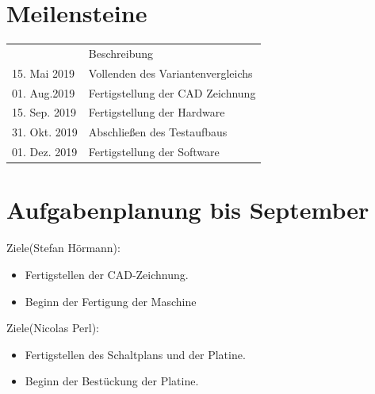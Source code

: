 \section{Meilensteine}
\begin{table}[h!]
    \begin{tabular}{ll}
        \hline
        \rowcolor[HTML]{C0C0C0}
        \multicolumn{2}{c}{\cellcolor[HTML]{C0C0C0}\textbf{Meilensteine}}                      \\ \hline
        \rowcolor[HTML]{EFEFEF}
        \multicolumn{1}{l|}{\cellcolor[HTML]{EFEFEF}Datum} & Beschreibung                      \\ \hline
        \multicolumn{1}{l|}{15. Mai 2019}                   & Vollenden des Variantenvergleichs \\ \hline
        \multicolumn{1}{l|}{01. Aug.2019}                    & Fertigstellung der CAD Zeichnung  \\ \hline
        \multicolumn{1}{l|}{15. Sep. 2019}                   & Fertigstellung der Hardware       \\ \hline
        \multicolumn{1}{l|}{31. Okt. 2019}                   & Abschließen des Testaufbaus       \\ \hline
        \multicolumn{1}{l|}{01. Dez. 2019}                    & Fertigstellung der Software       \\ \hline
    \end{tabular}
\end{table}

\section{Aufgabenplanung bis September}

Ziele(Stefan Hörmann):
\begin{itemize}
    \item Fertigstellen der CAD-Zeichnung.
    \item Beginn der Fertigung der Maschine
\end{itemize}

\noindent\hrulefill

Ziele(Nicolas Perl):
\begin{itemize}
    \item Fertigstellen des Schaltplans und der Platine.
    \item Beginn der Bestückung der Platine.
\end{itemize}

\noindent\hrulefill

